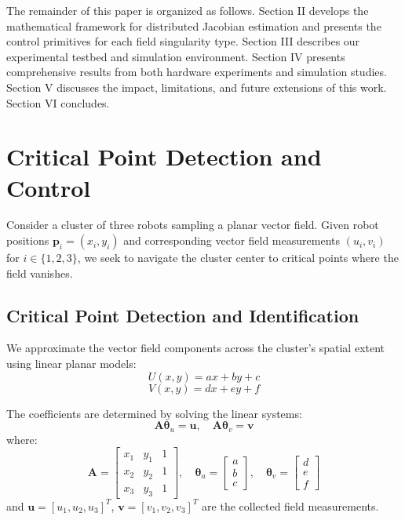 \documentclass[lettersize,journal]{IEEEtran}
\begin{document}
The remainder of this paper is organized as follows. Section II develops the mathematical framework for distributed Jacobian estimation and presents the control primitives for each field singularity type. Section III describes our experimental testbed and simulation environment. Section IV presents comprehensive results from both hardware experiments and simulation studies. Section V discusses the impact, limitations, and future extensions of this work. Section VI concludes.

\section{Critical Point Detection and Control}
\noindent 
Consider a cluster of three robots sampling a planar vector field. Given robot positions $\mathbf{p}_i = (x_i, y_i)$ and corresponding vector field measurements $(u_i, v_i)$ for $i \in \{1, 2, 3\}$, we seek to navigate the cluster center to critical points where the field vanishes.

\subsection{Critical Point Detection and Identification}
We approximate the vector field components across the cluster's spatial extent using linear planar models:
\begin{equation}
U(x,y) = ax + by + c
\end{equation}
\begin{equation}
V(x,y) = dx + ey + f
\end{equation}

The coefficients are determined by solving the linear systems:
\begin{equation}
\mathbf{A}\boldsymbol{\theta}_u = \mathbf{u}, \quad \mathbf{A}\boldsymbol{\theta}_v = \mathbf{v}
\end{equation}
where:
\begin{equation}
\mathbf{A} = \begin{bmatrix} x_1 & y_1 & 1 \\ x_2 & y_2 & 1 \\ x_3 & y_3 & 1 \end{bmatrix}, \quad \boldsymbol{\theta}_u = \begin{bmatrix} a \\ b \\ c \end{bmatrix}, \quad \boldsymbol{\theta}_v = \begin{bmatrix} d \\ e \\ f \end{bmatrix}
\end{equation}
and $\mathbf{u} = [u_1, u_2, u_3]^T$, $\mathbf{v} = [v_1, v_2, v_3]^T$ are the collected field measurements.
\end{document}
